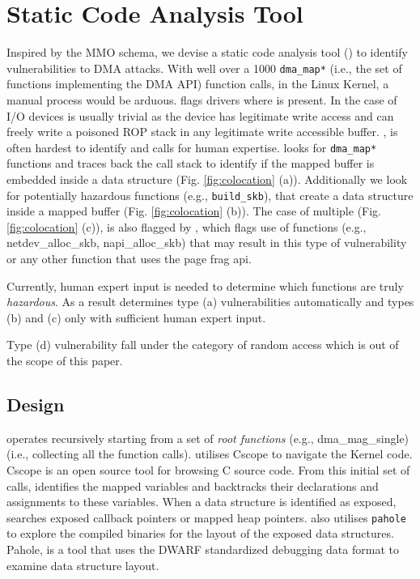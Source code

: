 \section{Static Code Analysis Tool}

Inspired by the MMO schema, we devise a static code analysis tool (\tool) to identify vulnerabilities to DMA attacks. With well over a 1000 \texttt{dma\_map*} (i.e., the set of functions implementing the DMA API) function calls, in the Linux Kernel, a manual process would be arduous. \tool flags drivers where \oportunity{} is present. In the case of I/O devices \motivation{} is usually trivial as the device has legitimate write access and can freely write a poisoned ROP stack in any legitimate write accessible buffer. \means{}, is often hardest to identify and calls for human expertise. \tool looks for \texttt{dma\_map*} functions and traces back the call stack to identify if the mapped buffer is embedded inside a data structure (Fig. \ref{fig:colocation} (a)). Additionally we look for potentially hazardous functions (e.g., \texttt{build\_skb}), that create a data structure inside a mapped buffer (Fig. \ref{fig:colocation} (b)). 
The case of multiple \iova{} (Fig. \ref{fig:colocation} (c)), is also flagged by \tool, which flags use of functions (e.g., netdev\_alloc\_skb, napi\_alloc\_skb) that may result in this type of vulnerability or any other function that uses the page frag api. 

Currently, human expert input is needed to determine which functions are truly \emph{hazardous}. As a result \tool determines type (a) vulnerabilities automatically and types (b) and (c) only with sufficient human expert input. 


Type (d) vulnerability fall under the category of random access 
which is out of the scope of this paper.

\subsection{Design}
\tool operates recursively starting from a set of \textit{root functions} (e.g., dma\_mag\_single) (i.e., collecting all the function calls). \tool utilises Cscope \cite{cscope,cscope_92} to navigate the Kernel code. Cscope is an open source tool for browsing C source code. From this initial set of calls, \tool identifies the mapped variables and backtracks their declarations and assignments to these variables. When a data structure is identified as exposed, \tool searches
exposed callback pointers or mapped heap pointers. \tool also utilises \texttt{pahole} \cite{dwarves} to explore the compiled binaries for the layout of the exposed data structures. Pahole, is a tool that uses the DWARF \cite{dwarf} standardized debugging data format to examine data structure layout.

